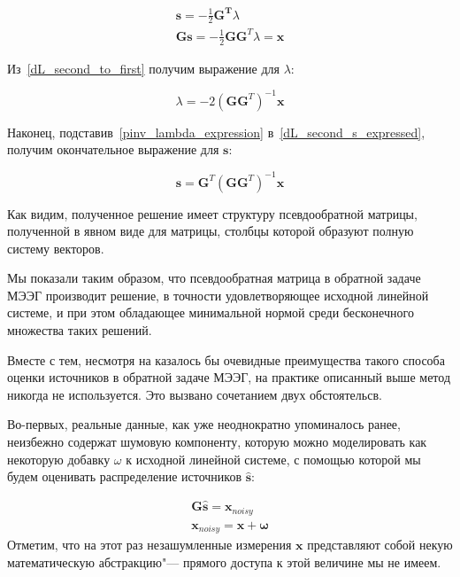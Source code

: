 \begin{gather}
    \mathbf{s} = - \frac{1}{2} \mathbf{G^T}\lambda
    \label{dL_second_s_expressed}\\
    \mathbf{Gs} = - \frac{1}{2} \mathbf{G} \mathbf{G}^T\lambda = \mathbf{x}
    \label{dL_second_to_first}
\end{gather}

Из~\ref{dL_second_to_first} получим выражение для $\lambda$:

\begin{equation}
    \lambda = - 2 {(\mathbf{G}\mathbf{G}^T)}^{-1}\mathbf{x}
    \label{pinv_lambda_expression}
\end{equation}

Наконец, подставив~\ref{pinv_lambda_expression} в~\ref{dL_second_s_expressed}, получим
окончательное выражение для $\mathbf{s}$:

\begin{equation}
    \mathbf{s} = \mathbf{G}^T{(\mathbf{GG}^T)}^{-1}\mathbf{x}
\end{equation}

Как видим, полученное решение имеет структуру псевдообратной матрицы,
полученной в явном виде для матрицы, столбцы которой образуют полную систему
векторов.

Мы показали таким образом, что псевдообратная матрица в обратной задаче МЭЭГ
производит решение, в точности удовлетворяющее исходной линейной системе, и при
этом обладающее минимальной нормой среди бесконечного множества таких решений.

Вместе с тем, несмотря на казалось бы очевидные преимущества такого способа
оценки источников в обратной задаче МЭЭГ, на практике описанный выше метод
никогда не используется. Это вызвано сочетанием двух обстоятельсв. 

Во-первых, реальные данные, как уже неоднократно упоминалось ранее, неизбежно
содержат шумовую компоненту, которую можно моделировать как некоторую добавку
$\omega$ к исходной линейной системе, с помощью которой мы будем оценивать
распределение источников $\mathbf{\hat{s}}$:

\begin{gather}
    \mathbf{G\hat{s}} = \mathbf{x}_{noisy}
    \label{original_linear_w_noise}\\
    \mathbf{x}_{noisy} = \mathbf{x} + \mathbf{\omega}
\end{gather}
Отметим, что на этот раз незашумленные измерения $\mathbf{x}$ представляют
собой некую математическую абстракцию"--- прямого доступа к этой величине мы
не имеем.

